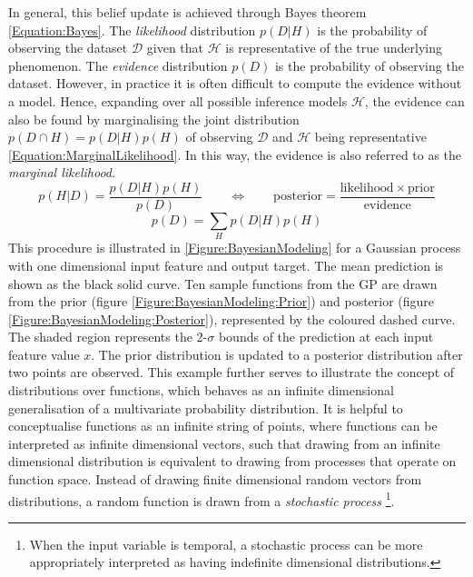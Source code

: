 			In general, this belief update is achieved through Bayes theorem \eqref{Equation:Bayes}. The \textit{likelihood} distribution $p(D | H)$ is the probability of observing the dataset $\mathcal{D}$ given that $\mathcal{H}$ is representative of the true underlying phenomenon. The \textit{evidence} distribution $p(D)$ is the probability of observing the dataset. However, in practice it is often difficult to compute the evidence without a model. Hence, expanding over all possible inference models $\mathcal{H}$, the evidence can also be found by marginalising the joint distribution $p(D \cap H) = p(D | H) p(H)$ of observing $\mathcal{D}$ and $\mathcal{H}$ being representative \eqref{Equation:MarginalLikelihood}. In this way, the evidence is also referred to as the \textit{marginal likelihood}. \begin{equation}
				p(H | D) = \frac{p(D | H) p(H)}{p(D)} \qquad \Longleftrightarrow \qquad \mathrm{posterior} = \frac{\mathrm{likelihood} \times \mathrm{prior}}{\mathrm{evidence}}
			\label{Equation:Bayes}
			\end{equation} \begin{equation}
				p(D) = \sum_{H} p(D | H) p(H)
			\label{Equation:MarginalLikelihood}
			\end{equation} This procedure is illustrated in \cref{Figure:BayesianModeling} for a Gaussian process with one dimensional input feature and output target. The mean prediction is shown as the black solid curve. Ten sample functions from the GP are drawn from the prior (figure \ref{Figure:BayesianModeling:Prior}) and posterior (figure \ref{Figure:BayesianModeling:Posterior}), represented by the coloured dashed curve. The shaded region represents the 2-$\sigma$ bounds of the prediction at each input feature value $x$. The prior distribution is updated to a posterior distribution after two points are observed. This example further serves to illustrate the concept of distributions over functions, which behaves as an infinite dimensional generalisation of a multivariate probability distribution. It is helpful to conceptualise functions as an infinite string of points, where functions can be interpreted as infinite dimensional vectors, such that drawing from an infinite dimensional distribution is equivalent to drawing from processes that operate on function space. Instead of drawing finite dimensional random vectors from distributions, a random function is drawn from a \textit{stochastic process} \footnote{When the input variable is temporal, a stochastic process can be more appropriately interpreted as having indefinite dimensional distributions.}.
			
